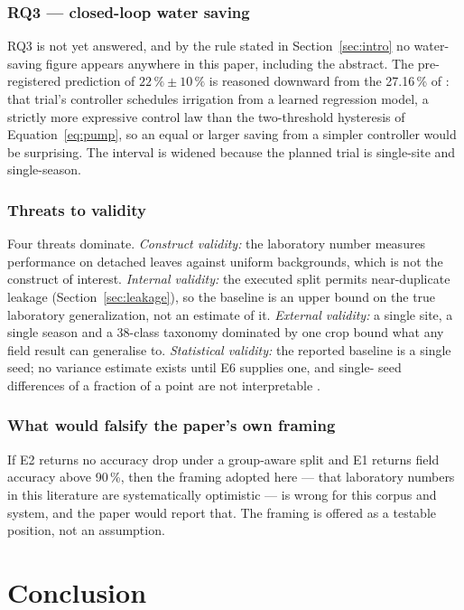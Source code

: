 \documentclass[journal]{IEEEtran}
\begin{document}
\subsubsection{RQ3 --- closed-loop water saving}
RQ3 is not yet answered, and by the rule stated in
Section~\ref{sec:intro} no water-saving figure appears anywhere in this
paper, including the abstract. The pre-registered prediction of
$22\,\%\pm10\,\%$ is reasoned downward from the 27.16\,\% of
\cite{usman2026aiirrigation}: that trial's controller schedules irrigation
from a learned regression model, a strictly more expressive control law
than the two-threshold hysteresis of Equation~\ref{eq:pump}, so an equal or
larger saving from a simpler controller would be surprising. The interval
is widened because the planned trial is single-site and single-season.

\subsubsection{Threats to validity}
Four threats dominate. \emph{Construct validity:} the laboratory number
measures performance on detached leaves against uniform backgrounds, which
is not the construct of interest. \emph{Internal validity:} the executed
split permits near-duplicate leakage (Section~\ref{sec:leakage}), so the
baseline is an upper bound on the true laboratory generalization, not an
estimate of it. \emph{External validity:} a single site, a single season
and a 38-class taxonomy dominated by one crop bound what any field result
can generalise to. \emph{Statistical validity:} the reported baseline is a
single seed; no variance estimate exists until E6 supplies one, and single-
seed differences of a fraction of a point are not interpretable
\cite{demsar2006statistical}.

\subsubsection{What would falsify the paper's own framing}
If E2 returns no accuracy drop under a group-aware split and E1 returns
field accuracy above 90\,\%, then the framing adopted here --- that
laboratory numbers in this literature are systematically optimistic --- is
wrong for this corpus and system, and the paper would report that. The
framing is offered as a testable position, not an assumption.

\section{Conclusion}
\label{sec:conclusion}
\end{document}
